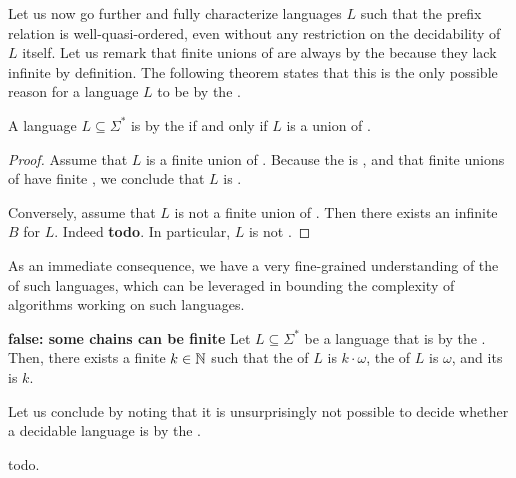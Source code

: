 Let us now go further and fully characterize languages $L$ such that the
prefix relation is well-quasi-ordered, even without any restriction on the
decidability of $L$ itself. Let us remark that finite unions of  are
always  by the  because they lack
infinite  by definition. The following theorem states that this
is the only possible reason for a language $L$ to be  by
the .

\begin{theorem}
    A language $L \subseteq \Sigma^*$ is  by the
     if and only if $L$ is a union of .
\end{theorem}
\begin{proof}
    Assume that $L$ is a finite union of .
    Because the  is ,
    and that finite unions of  have finite ,
    we conclude that $L$ is .

    Conversely, assume that $L$ is not a finite union of . Then
    there exists an infinite  $B$ for $L$. Indeed
    \textbf{todo}. In particular, $L$ is not .
\end{proof}

As an immediate consequence, we have a very fine-grained understanding of the
 of such  languages, which can be
leveraged in bounding the complexity of algorithms working on such languages.

\begin{corollary}
    \textbf{false: some chains can be finite}
    Let $L \subseteq \Sigma^*$ be a language that is  by
    the . Then, there exists a finite $k \in \mathbb{N}$ such that
    the
     of $L$ is $k \cdot \omega$,
    the  of $L$ is $\omega$, and its
     is $k$.
\end{corollary}


Let us conclude by noting that it is unsurprisingly not possible to decide
whether a decidable language is  by the .

\begin{lemma}
    todo.
\end{lemma}
